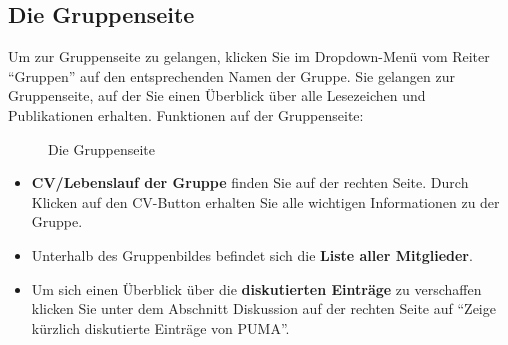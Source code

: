 \subsection{Die Gruppenseite}
Um zur Gruppenseite zu gelangen, klicken Sie im Dropdown-Menü vom Reiter  \enquote{Gruppen} auf den entsprechenden Namen der Gruppe. Sie gelangen zur Gruppenseite, auf der Sie einen Überblick über alle Lesezeichen und Publikationen erhalten.%
\newline\newline
Funktionen auf der Gruppenseite:
\begin{figure}[h!]
 \centering
 \caption{Die Gruppenseite}
 \label{figure063}
\end{figure}
\begin{itemize}
\item \textbf{CV/Lebenslauf der Gruppe} finden Sie auf der rechten Seite. Durch Klicken auf den CV-Button erhalten Sie alle wichtigen Informationen zu der Gruppe.
\item Unterhalb des Gruppenbildes befindet sich die \textbf{Liste aller Mitglieder}. 
\item Um sich einen Überblick über die \textbf{diskutierten Einträge} zu verschaffen klicken Sie unter dem Abschnitt Diskussion auf der rechten Seite auf \enquote{Zeige kürzlich diskutierte Einträge von PUMA}. 
\end{itemize}
 
